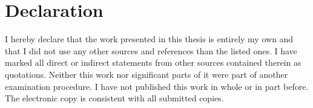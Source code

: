 \chapter*{Declaration}

I hereby declare that the work presented in this thesis is entirely
my own and that I did not use any other sources and references than the listed
ones. I have marked all direct or indirect statements from other sources
contained therein as quotations. Neither this work nor significant parts of it
were part of another examination procedure. I have not published this work in
whole or in part before. The electronic copy is consistent with all submitted
copies.
